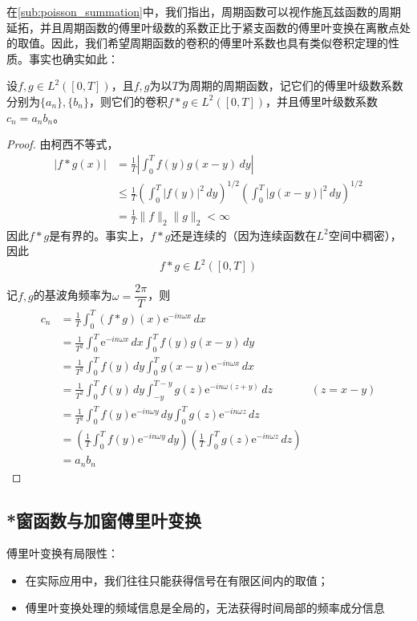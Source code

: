 \documentclass{ctexbook}
\begin{document}
在\ref{sub:poisson_summation}中，我们指出，周期函数可以视作施瓦兹函数的周期延拓，并且周期函数的傅里叶级数的系数正比于紧支函数的傅里叶变换在离散点处的取值。因此，我们希望周期函数的卷积的傅里叶系数也具有类似卷积定理的性质。事实也确实如此：
\begin{theorem}[周期函数的卷积定理]
    设$f,g\in L^2([0,T])$，且$f,g$为以$T$为周期的周期函数，记它们的傅里叶级数系数分别为$\{a_n\},\{b_n\}$，则它们的卷积$f*g\in L^2([0,T])$，并且傅里叶级数系数$c_n=a_n b_n$。
\end{theorem}
\begin{proof}
    由柯西不等式，
    \begin{align*}
        |f*g(x)|&=\frac{1}{T}\left|\int_0^{T}f(y)g(x-y)\,dy\right|\\
        &\leq \frac{1}{T}\left(\int_0^{T}|f(y)|^2\,dy\right)^{1/2}\left(\int_0^{T}|g(x-y)|^2\,dy\right)^{1/2}\\
        &=\frac{1}{T}\|f\|_2\|g\|_2<\infty
    \end{align*}
    因此$f*g$是有界的。事实上，$f*g$还是连续的（因为连续函数在$L^2$空间中稠密），因此
    $$f*g\in L^2([0,T])$$

    记$f,g$的基波角频率为$\omega=\dfrac{2\pi}{T}$，则
    \begin{align*}
        c_n&=\frac{1}{T}\int_0^{T}(f*g)(x)\mathrm{e}^{-in\omega x}\,dx\\
        &=\frac{1}{T^2}\int_0^{T}\mathrm{e}^{-in\omega x}\,dx\int_0^{T}f(y)g(x-y)\,dy\\
        &=\frac{1}{T^2}\int_0^{T}f(y)\,dy\int_0^{T}g(x-y)\mathrm{e}^{-in\omega x}\,dx\\
        &=\frac{1}{T^2}\int_0^{T}f(y)\,dy\int_{-y}^{T-y}g(z)\mathrm{e}^{-in\omega (z+y)}\,dz&(z=x-y)\\
        &=\frac{1}{T^2}\int_0^{T}f(y)\mathrm{e}^{-in\omega y}\,dy\int_0^{T}g(z)\mathrm{e}^{-in\omega z}\,dz\\
        &=\left(\frac{1}{T}\int_0^{T}f(y)\mathrm{e}^{-in\omega y}\,dy\right)\left(\frac{1}{T}\int_0^{T}g(z)\mathrm{e}^{-in\omega z}\,dz\right)\\
        &=a_n b_n
    \end{align*}
\end{proof}

\subsection{*窗函数与加窗傅里叶变换}\label{sub:window}

傅里叶变换有局限性：\begin{itemize}
    \item 在实际应用中，我们往往只能获得信号在有限区间内的取值；
    \item 傅里叶变换处理的频域信息是全局的，无法获得时间局部的频率成分信息
\end{itemize}
\end{document}
